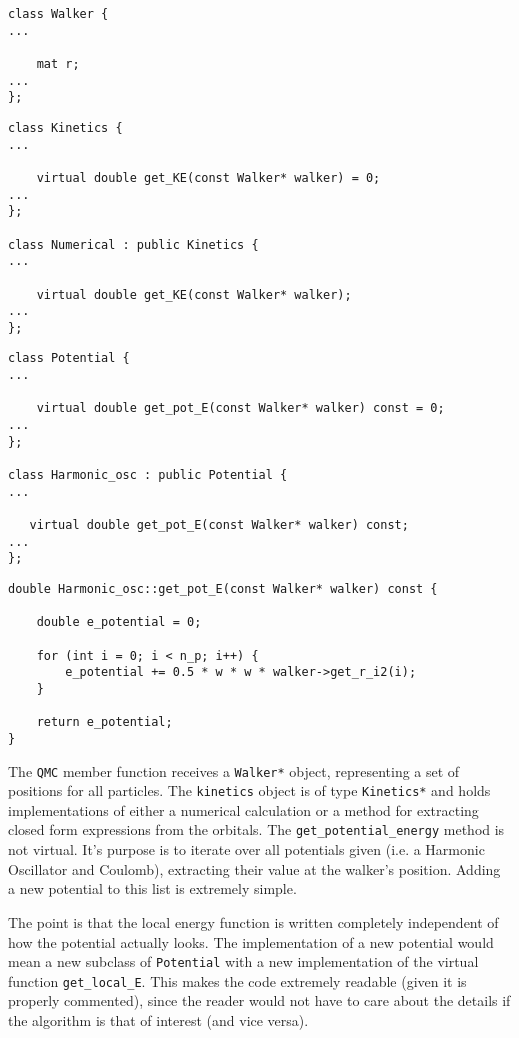 \begin{lstlisting}
class Walker {
...

    mat r;
...
};
\end{lstlisting}

\begin{lstlisting}
class Kinetics {
...

    virtual double get_KE(const Walker* walker) = 0;
...
};

class Numerical : public Kinetics {
...

    virtual double get_KE(const Walker* walker);
...
};
\end{lstlisting}

\begin{lstlisting}
class Potential {
...

    virtual double get_pot_E(const Walker* walker) const = 0;
...
};

class Harmonic_osc : public Potential {
...
   
   virtual double get_pot_E(const Walker* walker) const;
...
};
\end{lstlisting}

\begin{lstlisting}
double Harmonic_osc::get_pot_E(const Walker* walker) const {

    double e_potential = 0;

    for (int i = 0; i < n_p; i++) {
        e_potential += 0.5 * w * w * walker->get_r_i2(i);
    }

    return e_potential;
}
\end{lstlisting}





The \verb+QMC+ member function receives a \verb+Walker*+ object, representing a set of positions for all particles. The \verb+kinetics+ object is of type \verb+Kinetics*+ and holds implementations of either a numerical calculation or a method for extracting closed form expressions from the orbitals. The \verb+get_potential_energy+ method is not virtual. It's purpose is to iterate over all potentials given (i.e. a Harmonic Oscillator and Coulomb), extracting their value at the walker's position. Adding a new potential to this list is extremely simple. 

The point is that the local energy function is written completely independent of how the potential actually looks. The implementation of a new potential would mean a new subclass of \verb+Potential+ with a new implementation of the virtual function \verb+get_local_E+. This makes the code extremely readable (given it is properly commented), since the reader would not have to care about the details if the algorithm is that of interest (and vice versa).


